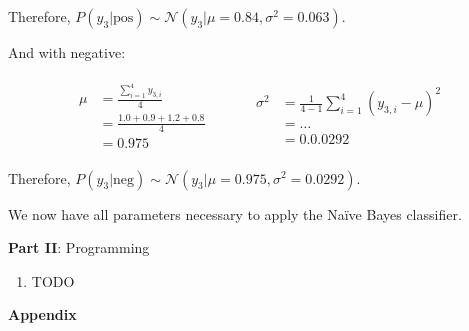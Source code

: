 \documentclass[12pt]{article}
\begin{document}
\begin{enumerate}[leftmargin=\labelsep,resume]
          Therefore, $P(y_3|\text{pos}) \sim \mathcal{N}(y_3 | \mu = 0.84, \sigma^2 = 0.063)$.

          And with negative:

          $$
              \begin{array}{c|c}
                  \begin{aligned}
                      \mu & = \frac{\sum^{4}_{i=1} y_{3,i}}{4} \\
                          & = \frac{1.0 + 0.9 + 1.2 + 0.8}{4}  \\
                          & = 0.975
                  \end{aligned}
                  \quad &
                  \quad
                  \begin{aligned}
                      \sigma^2 & = \frac{1}{4 - 1} \sum^4_{i=1} \left(y_{3,i} - \mu\right)^2 \\
                               & = \dots                                                     \\
                               & = 0.0.0292
                  \end{aligned}
              \end{array}
          $$

          Therefore, $P(y_3|\text{neg}) \sim \mathcal{N}(y_3 | \mu = 0.975, \sigma^2 = 0.0292)$.

          We now have all parameters necessary to apply the Naïve Bayes classifier.

\end{enumerate}

\center\large{\textbf{Part II}: Programming}

\begin{enumerate}[leftmargin=\labelsep]
    \item TODO
\end{enumerate}

\center\large{\textbf{Appendix}\vskip 0.3cm}
\end{document}

